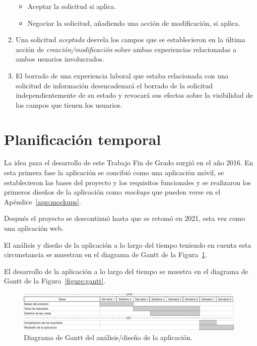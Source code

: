 \documentclass[a4paper, 12pt]{book}
\begin{document}
\begin{enumerate}
\begin{itemize}
            \item Aceptar la solicitud si aplica.
            \item Negociar la solicitud, añadiendo una acción de modificación, si aplica.
        \end{itemize}
        \item Una solicitud \emph{aceptada} desvela los campos que se establecieron en la última acción de \emph{creación/modificación} sobre ambas experiencias relacionadas a ambos usuarios involucrados.
        \item El borrado de una experiencia laboral que estaba relacionada con una solicitud de información desencadenará el borrado de la solicitud independientemente de su estado y revocará sus efectos sobre la visibilidad de los campos que tienen los usuarios.

    \end{enumerate}


    \section{Planificación temporal}
    \label{sec:planificacion-temporal}
    La idea para el desarrollo de este Trabajo Fin de Grado surgió en el año 2016. En esta primera fase la aplicación
    se concibió como una aplicación móvil, se establecieron las bases del proyecto y los requisitos funcionales y se realizaron
    los primeros diseños de la aplicación como \emph{mockups} que pueden verse en el Apéndice~\ref{app:mockups}.

    Después el proyecto se descontinuó hasta que se retomó en 2021, esta vez como una aplicación web.

    El análisis y diseño de la aplicación a lo largo del tiempo teniendo en cuenta esta circunstancia
    se muestran en el diagrama de Gantt de la Figura~\ref{figure:gantt2016}.

    El desarrollo de la aplicación a lo largo del tiempo se muestra en el diagrama de Gantt de la Figura~\ref{figure:gantt}.

    \begin{figure}
        \centering
        \includegraphics[width=15cm, keepaspectratio]{img/Gantt2016.png}
        \caption{Diagrama de Gantt del análisis/diseño de la aplicación.}\label{figure:gantt2016}
    \end{figure}
\end{document}
